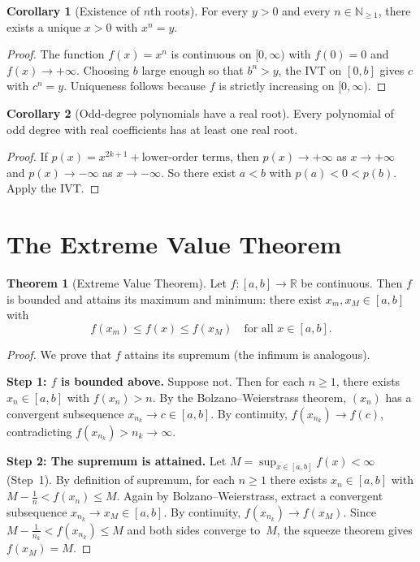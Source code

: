 \documentclass[12pt,a4paper,openany]{book}
\theoremstyle{definition}
\newtheorem{theorem}{Theorem}[chapter]
\newtheorem{corollary}{Corollary}[chapter]
\theoremstyle{remark}
\begin{document}
\begin{corollary}[Existence of $n$th roots]
\label{cor:nth-roots}
For every $y>0$ and every $n\in\mathbb{N}_{\ge 1}$, there exists a
unique $x>0$ with $x^n=y$.
\end{corollary}

\begin{proof}
The function $f(x)=x^n$ is continuous on $[0,\infty)$ with $f(0)=0$
and $f(x)\to+\infty$.  Choosing $b$ large enough so that $b^n>y$,
the IVT on $[0,b]$ gives $c$ with $c^n=y$.  Uniqueness follows
because $f$ is strictly increasing on $[0,\infty)$.
\end{proof}

\begin{corollary}[Odd-degree polynomials have a real root]
\label{cor:odd-poly}
Every polynomial of odd degree with real coefficients has at least
one real root.
\end{corollary}

\begin{proof}
If $p(x)=x^{2k+1}+\text{lower-order terms}$, then $p(x)\to+\infty$
as $x\to+\infty$ and $p(x)\to-\infty$ as $x\to-\infty$.  So there
exist $a<b$ with $p(a)<0<p(b)$.  Apply the IVT.
\end{proof}

\section{The Extreme Value Theorem}

\begin{theorem}[Extreme Value Theorem]
\label{thm:evt}
Let $f\colon[a,b]\to\mathbb{R}$ be continuous.  Then $f$ is bounded
and attains its maximum and minimum: there exist $x_m,x_M\in[a,b]$
with
\[
  f(x_m) \le f(x) \le f(x_M)
  \quad\text{for all } x\in[a,b].
\]
\end{theorem}

\begin{proof}
We prove that $f$ attains its supremum (the infimum is analogous).

\medskip\noindent
\textbf{Step 1: $f$ is bounded above.}\;
Suppose not.  Then for each $n\ge 1$, there exists $x_n\in[a,b]$ with
$f(x_n)>n$.  By the Bolzano--Weierstrass theorem, $(x_n)$ has a
convergent subsequence $x_{n_k}\to c\in[a,b]$.  By continuity,
$f(x_{n_k})\to f(c)$, contradicting $f(x_{n_k})>n_k\to\infty$.

\medskip\noindent
\textbf{Step 2: The supremum is attained.}\;
Let $M=\sup_{x\in[a,b]}f(x)<\infty$ (Step~1).  By definition of
supremum, for each $n\ge 1$ there exists $x_n\in[a,b]$ with
$M-\tfrac{1}{n}<f(x_n)\le M$.  Again by Bolzano--Weierstrass,
extract a convergent subsequence $x_{n_k}\to x_M\in[a,b]$.  By
continuity, $f(x_{n_k})\to f(x_M)$.  Since
$M-\tfrac{1}{n_k}<f(x_{n_k})\le M$ and both sides converge to~$M$,
the squeeze theorem gives $f(x_M)=M$.
\end{proof}
\end{document}
